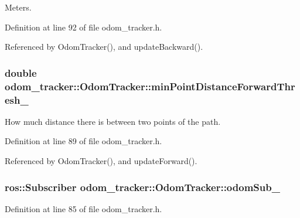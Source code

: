 Meters. 



Definition at line 92 of file odom\+\_\+tracker.\+h.



Referenced by Odom\+Tracker(), and update\+Backward().

\subsubsection[{\texorpdfstring{min\+Point\+Distance\+Forward\+Thresh\+\_\+}{minPointDistanceForwardThresh_}}]{\setlength{\rightskip}{0pt plus 5cm}double odom\+\_\+tracker\+::\+Odom\+Tracker\+::min\+Point\+Distance\+Forward\+Thresh\+\_\+\hspace{0.3cm}{\ttfamily [protected]}}\hypertarget{classodom__tracker_1_1OdomTracker_adda207eec9e5a5999e1e97e6f2876377}{}\label{classodom__tracker_1_1OdomTracker_adda207eec9e5a5999e1e97e6f2876377}


How much distance there is between two points of the path. 



Definition at line 89 of file odom\+\_\+tracker.\+h.



Referenced by Odom\+Tracker(), and update\+Forward().

\subsubsection[{\texorpdfstring{odom\+Sub\+\_\+}{odomSub_}}]{\setlength{\rightskip}{0pt plus 5cm}ros\+::\+Subscriber odom\+\_\+tracker\+::\+Odom\+Tracker\+::odom\+Sub\+\_\+\hspace{0.3cm}{\ttfamily [protected]}}\hypertarget{classodom__tracker_1_1OdomTracker_a186753d1ad08b52714312a124d62029f}{}\label{classodom__tracker_1_1OdomTracker_a186753d1ad08b52714312a124d62029f}


Definition at line 85 of file odom\+\_\+tracker.\+h.



